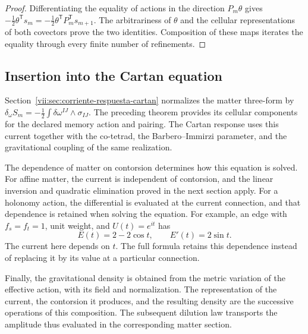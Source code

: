 \begin{proof}
Differentiating the equality of actions in the direction
\(P_m\theta\) gives
\(-\tfrac12\theta^{\mathsf T}s_m
 =-\tfrac12\theta^{\mathsf T}P_m^{\mathsf T}s_{m+1}\).
The arbitrariness of \(\theta\) and the cellular representations
of both covectors prove the two identities. Composition of these maps
iterates the equality through every finite number of refinements.
\end{proof}

\subsection{Insertion into the Cartan equation}

Section~\ref{vii:sec:corriente-respuesta-cartan} normalizes the
matter three-form by
\(\delta_\omega S_m=-\tfrac12\int\delta\omega^{IJ}\wedge
\sigma_{IJ}\). The preceding theorem provides its cellular
components for the declared memory action and pairing. The Cartan
response uses this current together with the co-tetrad, the
Barbero--Immirzi parameter, and the gravitational coupling of the same
realization.

The dependence of matter on contorsion determines how this equation is
solved. For affine matter, the current is independent of contorsion,
and the linear inversion and quadratic elimination proved in the next
section apply. For a holonomy action, the differential is evaluated at
the current connection, and that dependence is retained when solving
the equation. For example, an edge with
\(f_s=f_t=1\), unit weight, and \(U(t)=e^{it}\) has
\[
 E(t)=2-2\cos t,\qquad E'(t)=2\sin t.
\]
The current here depends on \(t\). The full formula retains this
dependence instead of replacing it by its value at a particular
connection.

Finally, the gravitational density is obtained from the metric
variation of the effective action, with its field and normalization.
The representation of the current, the contorsion it produces, and the
resulting density are the successive operations of this composition.
The subsequent dilution law transports the amplitude thus evaluated
in the corresponding matter section.
